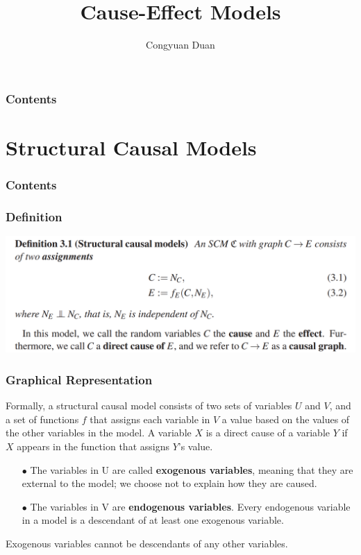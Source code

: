 \documentclass{beamer}
\title{Cause-Effect Models}
\author{Congyuan Duan}
\begin{document}
\frame{\titlepage}

\begin{frame}
    \frametitle{Contents}
    \tableofcontents
\end{frame}

\section{Structural Causal Models}

\begin{frame}
    \frametitle{Contents}
    \tableofcontents[currentsection]
\end{frame}

\begin{frame}
    \frametitle{Definition}
    \includegraphics[scale=0.55]{fig1.png} 
\end{frame}

\begin{frame}
    \frametitle{Graphical Representation}
    Formally, a structural causal model consists of two sets of variables $U$ and $V$, and a set of
    functions $f$ that assigns each variable in $V$ a value based on the values of the other variables
    in the model. A variable $X$ is a direct cause of a variable $Y$ if $X$ appears in the function that 
    assigns $Y$'s value. \\
    \begin{itemize}
        \item[$\bullet$] The variables in U are called \textbf{exogenous variables}, meaning that they are external to
        the model; we choose not to explain how they are caused.
        \item[$\bullet$] The variables in V are \textbf{endogenous variables}. Every endogenous variable in a model is a 
        descendant of at least one exogenous variable. 
    \end{itemize}
    Exogenous variables cannot be descendants of any other variables.
\end{frame}
\end{document}
